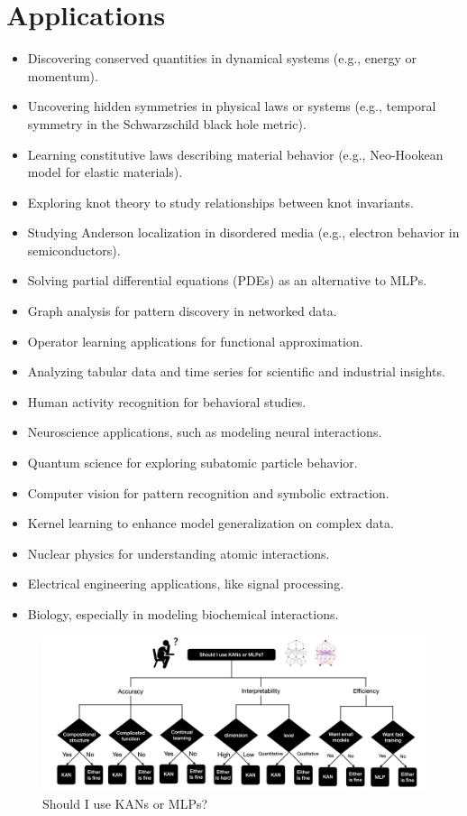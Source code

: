 \section{Applications}

\begin{itemize}
    \item Discovering conserved quantities in dynamical systems (e.g., energy or momentum).
    \item Uncovering hidden symmetries in physical laws or systems (e.g., temporal symmetry in the Schwarzschild black hole metric).
    \item Learning constitutive laws describing material behavior (e.g., Neo-Hookean model for elastic materials).
    \item Exploring knot theory to study relationships between knot invariants.
    \item Studying Anderson localization in disordered media (e.g., electron behavior in semiconductors).
    \item Solving partial differential equations (PDEs) as an alternative to MLPs.
    \item Graph analysis for pattern discovery in networked data.
    \item Operator learning applications for functional approximation.
    \item Analyzing tabular data and time series for scientific and industrial insights.
    \item Human activity recognition for behavioral studies.
    \item Neuroscience applications, such as modeling neural interactions.
    \item Quantum science for exploring subatomic particle behavior.
    \item Computer vision for pattern recognition and symbolic extraction.
    \item Kernel learning to enhance model generalization on complex data.
    \item Nuclear physics for understanding atomic interactions.
    \item Electrical engineering applications, like signal processing.
    \item Biology, especially in modeling biochemical interactions.
\end{itemize}

\begin{figure}[t]
    \centering
    \includegraphics[width=1\linewidth]{Images/decision_tree.png}
    \caption{Should I use KANs or MLPs?}
    \label{fig:decision-tree}
\end{figure}

